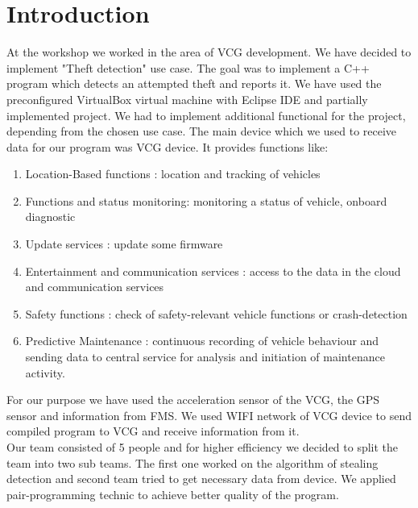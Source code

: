 \chapter{Introduction}
At the workshop we worked in the area of VCG development. We have decided to implement "Theft detection" use case. The goal was to implement a C++ program which detects an attempted theft and reports it. We have used the preconfigured VirtualBox virtual machine with Eclipse IDE and partially implemented project. We had to implement additional functional for the project, depending from the chosen use case.  The main device which we used to receive data for our program was VCG device. It provides functions like:
\begin{enumerate}
	\item Location-Based functions : location and tracking of vehicles 
	\item Functions and status monitoring:  monitoring a status of vehicle, onboard diagnostic
	\item Update services : update some firmware
	\item Entertainment and communication services : access to the data in the cloud and communication services
	\item Safety functions : check of safety-relevant vehicle functions or crash-detection
	\item Predictive Maintenance : continuous recording of vehicle behaviour and sending data to central service for analysis and initiation of maintenance activity.
\end{enumerate}
For our purpose we have used the acceleration sensor of the VCG, the GPS sensor and information from FMS. We used WIFI network of VCG device to send compiled program to VCG and receive information from it.\\ 
Our team consisted of 5 people and for higher efficiency we decided to split the team into two sub teams. The first one worked on the algorithm of stealing detection and second team tried to get necessary data from device. We applied pair-programming technic to achieve better quality of the program.\\